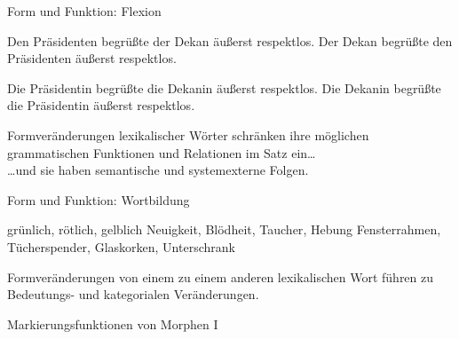 \begin{frame}
  {Form und Funktion: Flexion}
  \pause
  \begin{exe}
    \ex
    \begin{xlist}
      \ex \alert{Den Präsidenten} begrüßte \alert{der Dekan} äußerst respektlos.
      \pause
      \ex \alert{Der Dekan} begrüßte \alert{den Präsidenten} äußerst respektlos.
    \end{xlist}
    \pause
    \ex
    \begin{xlist}
      \ex \alert{Die Präsidentin} begrüßte \alert{die Dekanin} äußerst respektlos.
      \pause
      \ex \alert{Die Dekanin} begrüßte \alert{die Präsidentin} äußerst respektlos.
    \end{xlist}
  \end{exe}
  \pause
  \Zeile
  Formveränderungen lexikalischer Wörter \alert{schränken ihre möglichen grammatischen Funktionen und Relationen im Satz ein}\dots\\
  \pause
  \Halbzeile
  \dots und sie haben semantische und systemexterne Folgen.

\end{frame}

\begin{frame}
  {Form und Funktion: Wortbildung}
  \pause
  \begin{exe}
    \ex grün\alert{lich}, röt\alert{lich}, gelb\alert{lich}
    \pause
    \ex Neu\alert{igkeit}, Blöd\alert{heit}, Tauch\alert{er}, Heb\alert{ung}
    \pause
    \ex Fenster\alert{rahmen}, Tücher\alert{spender}, Glas\alert{korken}, Unter\alert{schrank}
  \end{exe}
  \pause
  \Zeile
  Formveränderungen von einem zu einem anderen lexikalischen Wort führen zu Bedeutungs- und kategorialen Veränderungen.
\end{frame}

\begin{frame}
  {Markierungsfunktionen von Morphen I}
  \pause
  \begin{exe}
    \ex
    \begin{xlist}
    \end{xlist}
    \pause
    \ex
    \begin{xlist}
    \end{xlist}
  \end{exe}
\end{frame}

